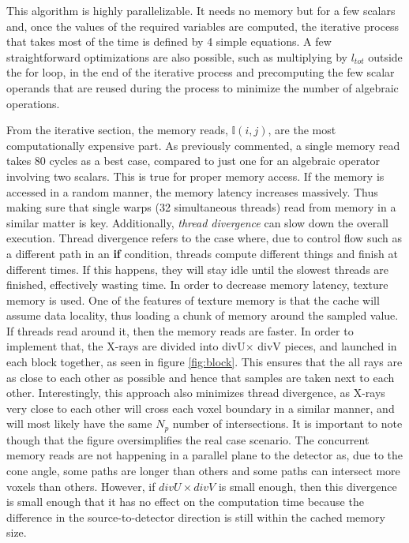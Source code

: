 

This algorithm is highly parallelizable. It needs no memory but for a few scalars and, once the values of the required variables are computed, the iterative process that takes most of the time is defined by 4 simple equations. A few straightforward optimizations are also possible, such as multiplying by $l_{tot}$ outside the for loop, in the end of the iterative process and precomputing the few scalar operands that are reused during the process to minimize the number of algebraic operations.




From the iterative section, the memory reads, $\mathbb{I}(i,j)$, are the most computationally expensive part. As previously commented, a single memory read takes 80 cycles as a best case, compared to just one for an algebraic operator involving two scalars. This is true for proper memory access. If the memory is accessed in a random manner, the memory latency increases massively. Thus making sure that single warps (32 simultaneous threads) read from memory in a similar matter is key. Additionally, \textit{thread divergence} can slow down the overall execution. Thread divergence refers to the case where, due to control flow such as a different path in an \textbf{if} condition, threads compute different things and finish at different times. If this happens, they will stay idle until the slowest threads are finished, effectively wasting time. In order to decrease memory latency, texture memory is used. One of the features of texture memory is that the cache will assume data locality, thus loading a chunk of memory around the sampled value. If threads read around it, then the memory reads are faster. In order to implement that, the X-rays are divided into divU$\times$ divV pieces, and launched in each block together, as seen in figure \ref{fig:block}. This ensures that the all rays are as close to each other as possible and hence that samples are taken next to each other. Interestingly, this approach also minimizes thread divergence, as X-rays very close to each other will cross each voxel boundary in a similar manner, and will most likely have the same $N_p$ number of intersections. It is important to note though that the figure oversimplifies the real case scenario. The concurrent memory reads are not happening in a parallel plane to the detector as, due to the cone angle, some paths are longer than others and some paths can intersect more voxels than others. However, if $divU\times divV$ is small enough, then this divergence is small enough that it has no effect on the computation time because the difference in the source-to-detector direction is still within the cached memory size.


